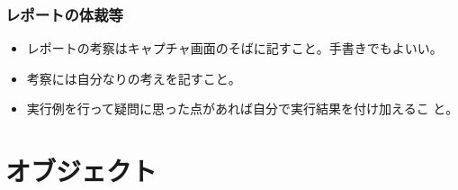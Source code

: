 \begin{frame}[containsverbatim]
 \frametitle{レポートの体裁等}
 \begin{itemize}
  \item レポートの考察はキャプチャ画面のそばに記すこと。手書きでもよいい。
  \item 考察には自分なりの考えを記すこと。
  \item 実行例を行って疑問に思った点があれば自分で実行結果を付け加えるこ
        と。
				\iffalse
  \item キャプチャ等の部分の印刷は希望があれば研究室で行うことも可能であ
        る。研究室にくる前にプリンタのドライバーをインストールしておくこ
        と。資料は次のところにある。

        {\small
        \texttt{http://www.hilano.org/hilano-lab/svg/driverDownload.pdf}}

        時間は要相談である。
				\fi
 \end{itemize}
\end{frame}
\section{オブジェクト}

